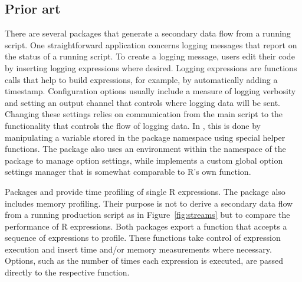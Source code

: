 \subsection{Prior art}
There are several packages that generate a secondary data flow from a running
script. One straightforward application concerns logging messages that report
on the status of a running script. To create a logging message, users edit
their code by inserting logging expressions where desired. Logging expressions
are functions calls that help to build expressions, for example, by
automatically adding a timestamp. Configuration options usually include a
measure of logging verbosity and setting an output channel that controls where
logging data will be sent.  Changing these settings relies on communication
from the main script to the functionality that controls the flow of logging
data.  In  \citep{daroczi2019logger}, this is done by manipulating a
variable stored in the package namespace using special helper functions.  The
 package \citep{frasca2019logging} also uses an environment within
the namespace of the package to manage option settings, while
 \citep{rowe2016futile.logger} implements a custom global
option settings manager that is somewhat comparable to R's own 
function. 

Packages  \citep{hester2019bench} and 
\citep{mersmann2018microbenchmark} provide time profiling of single R
expressions. The  package also includes memory profiling.  Their
purpose is not to derive a secondary data flow from a running production script
as in Figure~\ref{fig:streams} but to compare the performance of R expressions.
Both packages export a function that accepts a sequence of expressions to
profile.  These functions take control of expression execution and insert time
and/or memory measurements where necessary. Options, such as the number of
times each expression is executed, are passed directly to the respective
function. 

